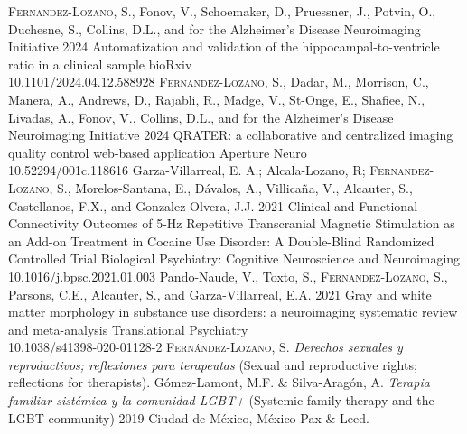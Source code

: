 \vspace{-3mm}
{
\setlength\tabcolsep{0pt} \setlength{\extrarowheight}{0pt}%
\begin{itemize}[leftmargin=5ex, nosep, noitemsep, itemindent=-13pt,
    label=\raisebox{0.25ex}{\tiny$\bullet$}]%
    \vspace{-1.8mm}%
    \cvarticle
    {{\scshape{Fernandez-Lozano, S}}., Fonov, V., Schoemaker, D.,
    Pruessner, J., Potvin, O., Duchesne, S., Collins, D.L.,
  and for the Alzheimer's Disease Neuroimaging Initiative}
    {2024}
    {Automatization and validation of the hippocampal-to-ventricle ratio in
    a clinical sample}
    {bioRxiv}
    {\\10.1101/2024.04.12.588928}
    \cvarticle
    {{\scshape{Fernandez-Lozano, S}}., Dadar, M., Morrison, C., Manera, A.,
    Andrews, D., Rajabli, R., Madge, V., St-Onge, E., Shafiee, N., Livadas, A.,
    Fonov, V., Collins, D.L., and for the Alzheimer's Disease Neuroimaging Initiative}
    {2024}
    {QRATER: a collaborative and centralized imaging quality control web-based
    application}
    {Aperture Neuro}
    {\\10.52294/001c.118616}
    \cvarticle
    {Garza-Villarreal, E. A.; Alcala-Lozano, R;
      {\scshape{Fernandez-Lozano, S}}., Morelos-Santana, E., Dávalos, A.,
      Villicaña, V., Alcauter, S., Castellanos, F.X., and Gonzalez-Olvera, J.J.}
    {2021}
    {Clinical and Functional Connectivity Outcomes of 5-Hz Repetitive
    Transcranial Magnetic Stimulation as an Add-on Treatment in Cocaine Use
  Disorder: A Double-Blind Randomized Controlled Trial}
    {Biological Psychiatry: Cognitive Neuroscience and Neuroimaging}
    {\\10.1016/j.bpsc.2021.01.003}
    \cvarticle
    {Pando-Naude, V., Toxto, S., {\scshape{Fernandez-Lozano, S}}.,
      Parsons, C.E., Alcauter, S., and Garza-Villarreal, E.A.}
    {2021}
    {Gray and white matter morphology in substance use disorders: a neuroimaging systematic review and meta-analysis}
    {Translational Psychiatry}
    {\\10.1038/s41398-020-01128-2}
    \cvchapt
    {\scshape{Fernández-Lozano, S.}}
        {\textit{Derechos sexuales y reproductivos; reflexiones para terapeutas}
        (Sexual and reproductive rights; reflections for therapists).}
        {Gómez-Lamont, M.F. \& Silva-Aragón, A.}
        {\textit{Terapia familiar sistémica y la comunidad LGBT+}
          (Systemic family therapy and the LGBT community)}
        {2019}
        {Ciudad de México, México}
        {Pax \& Leed.}
\end{itemize}
}
